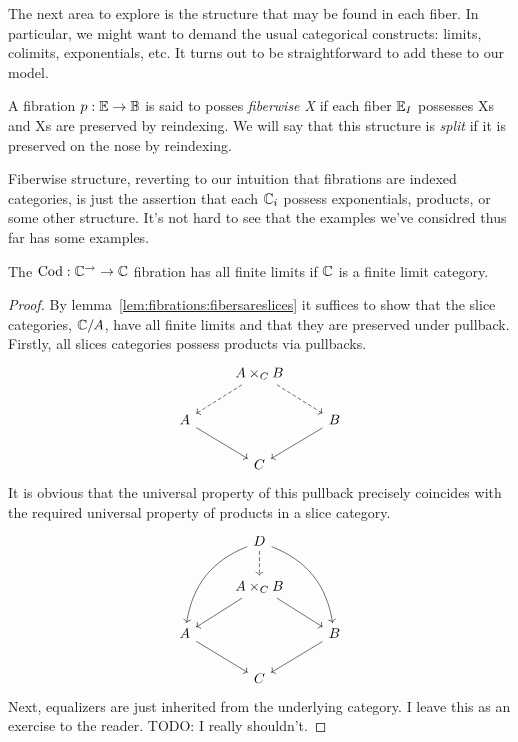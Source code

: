 The next area to explore is the structure that may be found in each
fiber. In particular, we might want to demand the usual categorical
constructs: limits, colimits, exponentials, etc. It turns out to be
straightforward to add these to our model.
\begin{defn}\label{defn:fibrations:fiberwiseX}
  A fibration $p : \mathbb{E} \to \mathbb{B}$ is said to posses \emph{fiberwise
    X} if each fiber $\mathbb{E}_I$ possesses Xs and Xs are preserved by
  reindexing. We will say that this structure is \emph{split} if it is
  preserved on the nose by reindexing.
\end{defn}
Fiberwise structure, reverting to our intuition that fibrations are
indexed categories, is just the assertion that each $\mathbb{C}_i$ possess
exponentials, products, or some other structure. It's not hard to see
that the examples we've considred thus far has some examples.
\begin{example}\label{defn:fibrations:codfiberwiseproducts}
  The $\operatorname{Cod} : \mathbb{C}^{\to} \to \mathbb{C}$ fibration has all finite limits
  if $\mathbb{C}$ is a finite limit category.
\end{example}
\begin{proof}
  By lemma~\ref{lem:fibrations:fibersareslices} it suffices to show
  that the slice categories, $\mathbb{C}/A$, have all finite limits and
  that they are preserved under pullback. Firstly, all slices
  categories possess products via pullbacks.
  \[
    \begin{tikzcd}
      & A \times_C B \ar[dl, dashed] \ar[dr, dashed] &\\
      A \ar[dr] && B \ar[dl] \\
      & C &
    \end{tikzcd}
  \]
  It is obvious that the universal property of this pullback precisely
  coincides with the required universal property of products in a
  slice category.
  \[
    \begin{tikzcd}
      & D\ar[ddl, bend right] \ar[ddr, bend left] \ar[d, dashed]  &\\
      & A \times_C B \ar[dl] \ar[dr] &\\
      A \ar[dr] && B \ar[dl] \\
      & C &
    \end{tikzcd}
  \]
  Next, equalizers are just inherited from the underlying category. I
  leave this as an exercise to the reader. TODO: I really shouldn't.
\end{proof}


